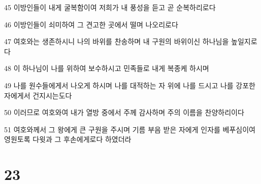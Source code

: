 \par 45 이방인들이 내게 굴복함이여 저희가 내 풍성을 듣고 곧 순복하리로다
\par 46 이방인들이 쇠미하여 그 견고한 곳에서 떨며 나오리로다
\par 47 여호와는 생존하시니 나의 바위를 찬송하며 내 구원의 바위이신 하나님을 높일지로다
\par 48 이 하나님이 나를 위하여 보수하시고 민족들로 내게 복종케 하시며
\par 49 나를 원수들에게서 나오게 하시며 나를 대적하는 자 위에 나를 드시고 나를 강포한 자에게서 건지시는도다
\par 50 이러므로 여호와여 내가 열방 중에서 주께 감사하며 주의 이름을 찬양하리이다
\par 51 여호와께서 그 왕에게 큰 구원을 주시며 기름 부음 받은 자에게 인자를 베푸심이여 영원토록 다윗과 그 후손에게로다 하였더라

\chapter{23}

